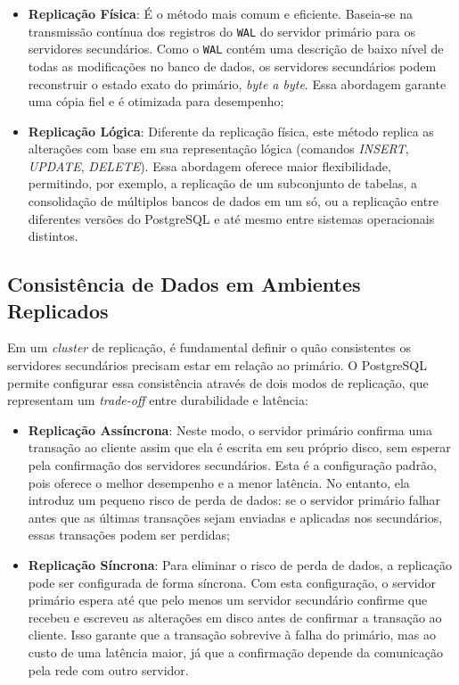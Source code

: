         \begin{itemize}
            \item \textbf{Replicação Física}: É o método mais comum e eficiente. Baseia-se na transmissão contínua dos registros do \verb|WAL| do servidor primário para os servidores secundários. Como o \verb|WAL| contém uma descrição de baixo nível de todas as modificações no banco de dados, os servidores secundários podem reconstruir o estado exato do primário, \textit{byte a byte}. Essa abordagem garante uma cópia fiel e é otimizada para desempenho;
            
            \item \textbf{Replicação Lógica}: Diferente da replicação física, este método replica as alterações com base em sua representação lógica (comandos \textit{INSERT}, \textit{UPDATE}, \textit{DELETE}). Essa abordagem oferece maior flexibilidade, permitindo, por exemplo, a replicação de um subconjunto de tabelas, a consolidação de múltiplos bancos de dados em um só, ou a replicação entre diferentes versões do PostgreSQL e até mesmo entre sistemas operacionais distintos.
        \end{itemize}

    \subsection{Consistência de Dados em Ambientes Replicados}

        Em um \textit{cluster} de replicação, é fundamental definir o quão consistentes os servidores secundários precisam estar em relação ao primário. O PostgreSQL permite configurar essa consistência através de dois modos de replicação, que representam um \textit{trade-off} entre durabilidade e latência:
        
        \begin{itemize}
            \item \textbf{Replicação Assíncrona}: Neste modo, o servidor primário confirma uma transação ao cliente assim que ela é escrita em seu próprio disco, sem esperar pela confirmação dos servidores secundários. Esta é a configuração padrão, pois oferece o melhor desempenho e a menor latência. No entanto, ela introduz um pequeno risco de perda de dados: se o servidor primário falhar antes que as últimas transações sejam enviadas e aplicadas nos secundários, essas transações podem ser perdidas;
            
            \item \textbf{Replicação Síncrona}: Para eliminar o risco de perda de dados, a replicação pode ser configurada de forma síncrona. Com esta configuração, o servidor primário espera até que pelo menos um servidor secundário confirme que recebeu e escreveu as alterações em disco antes de confirmar a transação ao cliente. Isso garante que a transação sobrevive à falha do primário, mas ao custo de uma latência maior, já que a confirmação depende da comunicação pela rede com outro servidor.
        \end{itemize}

